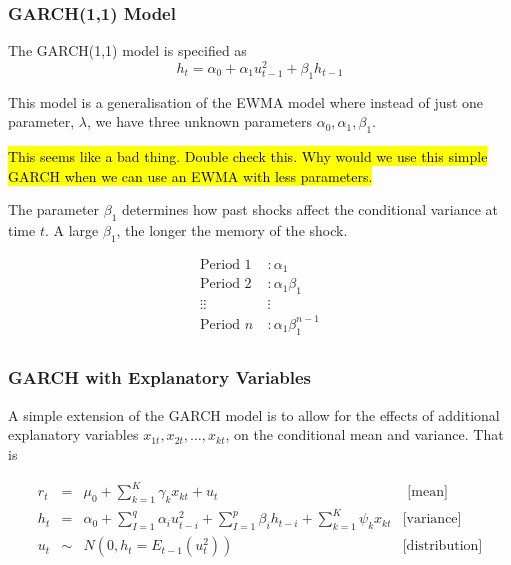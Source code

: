 \documentclass[11pt]{article}
\begin{document}
\subsubsection{GARCH(1,1) Model}

The GARCH(1,1) model is specified as
\begin{equation}
\label{GARCH(11)}
h_t = \alpha_0 + \alpha_1 u_{t-1}^2 + \beta_1 h_{t-1}
\end{equation}

This model is a generalisation of the EWMA model where instead of just one parameter, $\lambda$, we have three unknown parameters $\alpha_0, \alpha_1, \beta_1$.

\hl{This seems like a bad thing. Double check this. Why would we use this simple GARCH when we can use an EWMA with less parameters.}


The parameter $\beta_1$ determines how past shocks affect the conditional variance at time $t$. A large $\beta_1$, the longer the memory of the shock. 

\begin{equation}
\begin{aligned}
\text{Period 1 } &: \alpha_1 \\
\text{Period 2 } &: \alpha_1\beta_1 \\
\vdots \vdots& \vdots \\
\text{Period }n &: \alpha_1\beta_1^{n-1} \\
\end{aligned}
\end{equation}

\subsubsection{GARCH with Explanatory Variables}

A simple extension of the GARCH model is to allow for the effects of additional explanatory variables $x_{1t},x_{2t},\ldots,x_{kt}$, on the conditional mean and variance. That is

\begin{equation}
\begin{array}{cccc}
r_t & = & \mu_0 + \sum_{k=1}^K \gamma_k x_{kt} + u_t & \text{ [mean]} \\
h_t & = & \alpha_0 + \sum_{I=1}^q \alpha_i u_{t-i}^2 + \sum_{I=1}^p \beta_i h_{t-i} + \sum_{k=1}^K \psi_k x_{kt} & \text{[variance]} \\
u_t & \sim & N(0,h_t = E_{t-1}(u_t^2)) & \text{[distribution]}
\end{array}
\end{equation}
\end{document}
